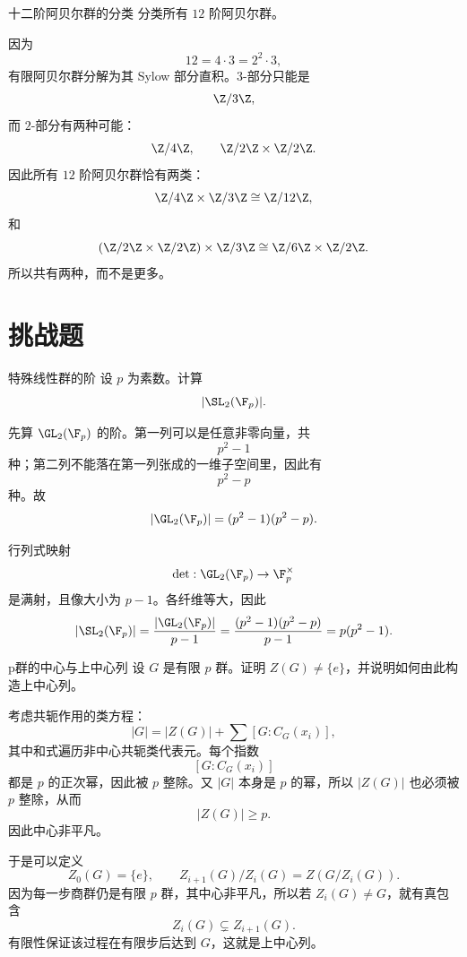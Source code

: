 \begin{problem}{十二阶阿贝尔群的分类}
\medium
分类所有 $12$ 阶阿贝尔群。
\end{problem}
\begin{solution}
因为
\[
12=4\cdot3=2^2\cdot3,
\]
有限阿贝尔群分解为其 Sylow 部分直积。$3$-部分只能是
\[
\Z/3\Z,
\]
而 $2$-部分有两种可能：
\[
\Z/4\Z,
\qquad
\Z/2\Z\times\Z/2\Z.
\]
因此所有 $12$ 阶阿贝尔群恰有两类：
\[
\Z/4\Z\times\Z/3\Z\cong\Z/12\Z,
\]
和
\[
(\Z/2\Z\times\Z/2\Z)\times\Z/3\Z
\cong\Z/6\Z\times\Z/2\Z.
\]
所以共有两种，而不是更多。
\end{solution}

\section{挑战题 \hard}

\begin{problem}{特殊线性群的阶}
\hard
设 $p$ 为素数。计算
\[
|\SL_2(\F_p)|.
\]
\end{problem}
\begin{solution}
先算 $\GL_2(\F_p)$ 的阶。第一列可以是任意非零向量，共
\[
p^2-1
\]
种；第二列不能落在第一列张成的一维子空间里，因此有
\[
p^2-p
\]
种。故
\[
|\GL_2(\F_p)|=(p^2-1)(p^2-p).
\]

行列式映射
\[
\det:\GL_2(\F_p)\to\F_p^\times
\]
是满射，且像大小为 $p-1$。各纤维等大，因此
\[
|\SL_2(\F_p)|=\frac{|\GL_2(\F_p)|}{p-1}
=\frac{(p^2-1)(p^2-p)}{p-1}=p(p^2-1).
\]
\end{solution}

\begin{problem}{p群的中心与上中心列}
\hard
设 $G$ 是有限 $p$ 群。证明 $Z(G)\neq\{e\}$，并说明如何由此构造上中心列。
\end{problem}
\begin{solution}
考虑共轭作用的类方程：
\[
|G|=|Z(G)|+\sum [G:C_G(x_i)],
\]
其中和式遍历非中心共轭类代表元。每个指数
\[
[G:C_G(x_i)]
\]
都是 $p$ 的正次幂，因此被 $p$ 整除。又 $|G|$ 本身是 $p$ 的幂，所以 $|Z(G)|$ 也必须被 $p$ 整除，从而
\[
|Z(G)|\ge p.
\]
因此中心非平凡。

于是可以定义
\[
Z_0(G)=\{e\},
\qquad
Z_{i+1}(G)/Z_i(G)=Z(G/Z_i(G)).
\]
因为每一步商群仍是有限 $p$ 群，其中心非平凡，所以若 $Z_i(G)\neq G$，就有真包含
\[
Z_i(G)\subsetneq Z_{i+1}(G).
\]
有限性保证该过程在有限步后达到 $G$，这就是上中心列。
\end{solution}

